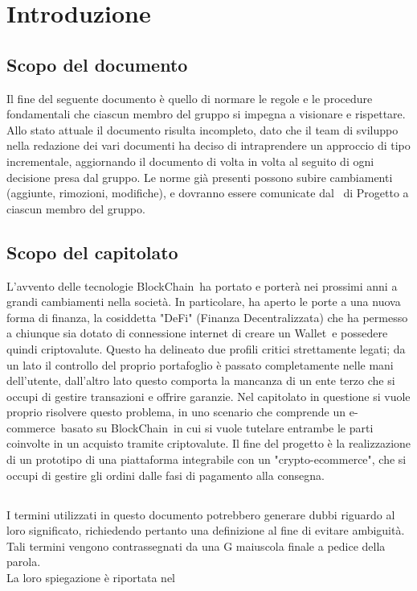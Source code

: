 \section{Introduzione} \label{section: introduzione}

\subsection {Scopo del documento}
Il fine del seguente documento è quello di normare le regole e le procedure fondamentali che ciascun membro del gruppo \groupName si impegna a visionare e rispettare.
Allo stato attuale il documento risulta incompleto, dato che il team di sviluppo nella redazione dei vari documenti ha deciso di intraprendere un approccio di tipo incrementale, aggiornando il documento di volta in volta al seguito di ogni decisione presa dal gruppo.
Le norme già presenti possono subire cambiamenti (aggiunte, rimozioni, modifiche), e dovranno essere comunicate dal \roleProjectManagerLow\ di Progetto a ciascun membro del gruppo.

\subsection{Scopo del capitolato}
L'avvento delle tecnologie BlockChain\glo\ ha portato e porterà nei prossimi anni a grandi cambiamenti nella società. 
In particolare, ha aperto le porte a una nuova forma di finanza, la cosiddetta "DeFi" (Finanza Decentralizzata) che ha permesso a chiunque sia dotato di connessione internet di creare un Wallet\glo\ e possedere quindi criptovalute\glo.
Questo ha delineato due profili critici strettamente legati; da un lato il controllo del proprio portafoglio è passato completamente nelle mani dell'utente, dall'altro lato questo comporta la mancanza di un ente terzo che si occupi di gestire transazioni e offrire garanzie.
\newline
Nel capitolato in questione si vuole proprio risolvere questo problema, in uno scenario che comprende un e-commerce\glo\ basato su BlockChain\glo\ in cui si vuole tutelare entrambe le parti coinvolte in un acquisto tramite criptovalute.
\newline
Il fine del progetto è la realizzazione di un prototipo di una piattaforma integrabile con un "crypto-ecommerce\glo", che si occupi di gestire gli ordini dalle fasi di pagamento alla consegna.

\subsection{\docNameGlo}
I termini utilizzati in questo documento potrebbero generare dubbi riguardo al loro significato, richiedendo pertanto una definizione al fine di evitare ambiguità.\\
Tali termini vengono contrassegnati da una G maiuscola finale a pedice della parola.\\
La loro spiegazione è riportata nel \docNameVersionGlo

